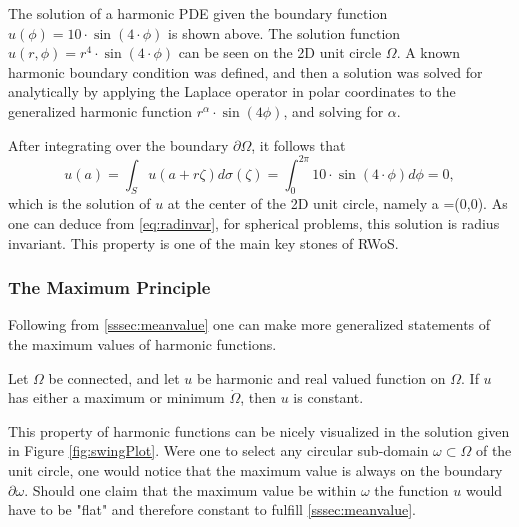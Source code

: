  The solution of a harmonic \gls{PDE} given the boundary
function $u(\phi)=10\cdot\sin(4\cdot\phi)$ is shown above. The solution function $u(r,\phi)=r^{4}\cdot\sin(4\cdot\phi)$
can be seen on the 2D unit circle $\Omega$.  A known harmonic boundary
condition was defined, and then a solution was solved for analytically by applying the Laplace operator
in polar coordinates to the generalized harmonic function $r^{\alpha}\cdot\sin(4\phi)$,
and solving for $\alpha$.

After integrating over the boundary $\partial \Omega$, it follows that \begin{equation}
u(a) = \int_{S}u(a + r\zeta)d\sigma(\zeta) = \int_{0}^{2\pi} 10\cdot\sin(4\cdot\phi)d\phi = 0,
\label{eq:radinvar}
\end{equation}
which is the solution of $u$ at the center of the 2D unit circle,
namely a =(0,0). As one can deduce from \eqref{eq:radinvar}, for spherical problems, this solution is
radius invariant.  This property is one of the main key stones of \Gls{RWoS}. \label{radiusInvariance}
  \subsubsection{The Maximum Principle}\label{sssec:maximum}
  Following from \ref{sssec:meanvalue} one can make more generalized statements of
  the maximum values of harmonic functions.
  \begin{theorem}
      Let $\Omega$ be connected, and let $u$ be harmonic and real valued function on $\Omega$.
      If $u$ has either a maximum or minimum $\dot{\Omega}$, then $u$ is constant\cite{Sheldon}.
  \end{theorem}

  This property of harmonic functions can be nicely visualized in the solution given
  in Figure \ref{fig:swingPlot}. Were one to select any circular
  sub-domain $\omega \subset \Omega$ of the unit circle, one would notice that the maximum value is always
  on the boundary  $\partial \omega$.  Should one claim that the maximum  value be within $\omega$
  the function $u$ would have to be "flat" and therefore constant to fulfill \ref{sssec:meanvalue}.

